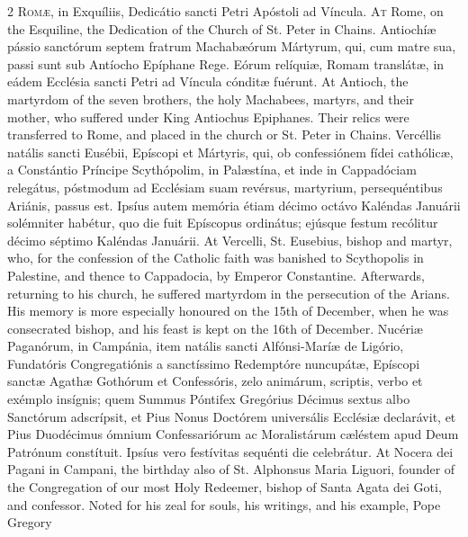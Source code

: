 \begin{paracol}{2}
\lettrine[lines=2]{R}{omæ,} in Exquíliis, 
 Dedicátio sancti Petri Apóstoli ad Víncula.
\switchcolumn
{}
\lettrine[lines=2]{A}{t} Rome, on the Esquiline, the 
 Dedication of the Church of St. Peter in Chains.
\switchcolumn*
{}
Antiochíæ pássio 
 sanctórum septem fratrum Machabæórum Mártyrum, qui, cum matre sua, passi 
 sunt sub Antíocho Epíphane Rege. Eórum relíquiæ, Romam translátæ, in 
 eádem Ecclésia sancti Petri ad Víncula cónditæ fuérunt.
\switchcolumn
{}
At Antioch, the martyrdom of the 
 seven brothers, the holy Machabees, martyrs, and their mother, who suffered 
 under King Antiochus Epiphanes. Their relics were transferred to Rome, 
 and placed in the church or St. Peter in Chains.
\switchcolumn*
{}
Vercéllis natális 
 sancti Eusébii, Epíscopi et Mártyris, qui, ob confessiónem fídei cathólicæ, 
 a Constántio Príncipe Scythópolim, in Palæstína, et inde in Cappadóciam 
 relegátus, póstmodum ad Ecclésiam suam revérsus, martyrium, persequéntibus 
 Ariánis, passus est. Ipsíus autem memória étiam décimo octávo Kaléndas 
 Januárii solémniter habétur, quo die fuit Epíscopus ordinátus; ejúsque 
 festum recólitur décimo séptimo Kaléndas Januárii.
\switchcolumn
{}
At Vercelli, St. Eusebius, bishop 
 and martyr, who, for the confession of the Catholic faith was banished to 
 Scythopolis in Palestine, and thence to Cappadocia, by Emperor Constantine. 
 Afterwards, returning to his church, he suffered martyrdom in the 
 persecution of the Arians. His memory is more especially honoured on 
 the 15th of December, when he was consecrated bishop, and his feast is kept 
 on the 16th of December.
\switchcolumn*
{}
Nucériæ Paganórum, in 
 Campánia, item natális sancti Alfónsi-Maríæ de Ligório, Fundatóris 
 Congregatiónis a sanctíssimo Redemptóre nuncupátæ, Epíscopi sanctæ Agathæ 
 Gothórum et Confessóris, zelo animárum, scriptis, verbo et exémplo insígnis; 
 quem Summus Póntifex Gregórius Décimus sextus albo Sanctórum adscrípsit, et 
 Pius Nonus Doctórem universális Ecclésiæ declarávit, et Pius Duodécimus 
 ómnium Confessariórum ac Moralistárum cæléstem apud Deum Patrónum constítuit. 
 Ipsíus vero festívitas sequénti die celebrátur.
\switchcolumn
{}
At Nocera dei Pagani in Campani, the 
 birthday also of St. Alphonsus Maria Liguori, founder of the Congregation of 
 our most Holy Redeemer, bishop of Santa Agata dei Goti, and confessor. 
 Noted for his zeal for souls, his writings, and his example, Pope Gregory 

\end{paracol}
